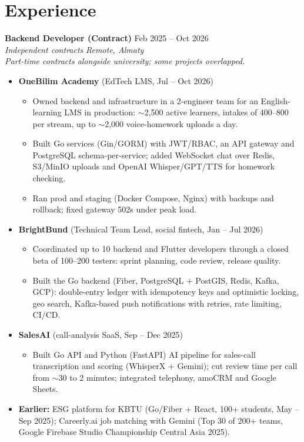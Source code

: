 \documentclass[10pt,a4paper]{article}
\newcommand{\resumeEntry}[4]{%
  \textbf{#1} \hfill #2\\
  \textit{#3} \hfill \textit{#4}\vspace{-2pt}
}
\begin{document}
\section{Experience}
\resumeEntry{Backend Developer (Contract)}{Feb 2025 -- Oct 2026}{Independent contracts}{Remote, Almaty}\\
\textit{Part-time contracts alongside university; some projects overlapped.}
\begin{itemize}
  \item \textbf{OneBilim Academy} (EdTech LMS, Jul -- Oct 2026)
  \begin{itemize}
    \item Owned backend and infrastructure in a 2-engineer team for an English-learning LMS in production: $\sim$2,500 active learners, intakes of 400--800 per stream, up to $\sim$2,000 voice-homework uploads a day.
    \item Built Go services (Gin/GORM) with JWT/RBAC, an API gateway and PostgreSQL schema-per-service; added WebSocket chat over Redis, S3/MinIO uploads and OpenAI Whisper/GPT/TTS for homework checking.
    \item Ran prod and staging (Docker Compose, Nginx) with backups and rollback; fixed gateway 502s under peak load.
  \end{itemize}
  \item \textbf{BrightBund} (Technical Team Lead, social fintech, Jan -- Jul 2026)
  \begin{itemize}
    \item Coordinated up to 10 backend and Flutter developers through a closed beta of 100--200 testers: sprint planning, code review, release quality.
    \item Built the Go backend (Fiber, PostgreSQL + PostGIS, Redis, Kafka, GCP): double-entry ledger with idempotency keys and optimistic locking, geo search, Kafka-based push notifications with retries, rate limiting, CI/CD.
  \end{itemize}
  \item \textbf{SalesAI} (call-analysis SaaS, Sep -- Dec 2025)
  \begin{itemize}
    \item Built Go API and Python (FastAPI) AI pipeline for sales-call transcription and scoring (WhisperX + Gemini); cut review time per call from $\sim$30 to 2 minutes; integrated telephony, amoCRM and Google Sheets.
  \end{itemize}
  \item \textbf{Earlier:} ESG platform for KBTU (Go/Fiber + React, 100+ students, May -- Sep 2025); Careerly.ai job matching with Gemini (Top 30 of 200+ teams, Google Firebase Studio Championship Central Asia 2025).
\end{itemize}
\end{document}
